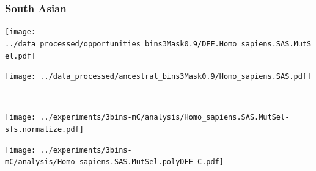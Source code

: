 \subsubsection{South Asian}

\begin{minipage}{0.49\linewidth}
    \texttt{[image: ../data\_processed/opportunities\_bins3Mask0.9/DFE.Homo\_sapiens.SAS.MutSel.pdf]}
\end{minipage}
\begin{minipage}{0.49\linewidth}
    \texttt{[image: ../data\_processed/ancestral\_bins3Mask0.9/Homo\_sapiens.SAS.pdf]}
\end{minipage}
\\
\begin{minipage}{0.49\linewidth}
    \texttt{[image: ../experiments/3bins-mC/analysis/Homo\_sapiens.SAS.MutSel-sfs.normalize.pdf]}
\end{minipage}
\begin{minipage}{0.4\linewidth}
    \texttt{[image: ../experiments/3bins-mC/analysis/Homo\_sapiens.SAS.MutSel.polyDFE\_C.pdf]}
\end{minipage}
